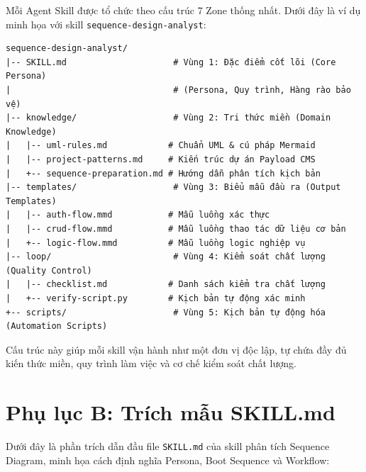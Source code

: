 \documentclass[13pt,a4paper,oneside]{extreport}
\numberwithin{equation}{chapter}
\numberwithin{figure}{chapter}
\numberwithin{table}{chapter}
\begin{document}
Mỗi Agent Skill được tổ chức theo cấu trúc 7 Zone thống nhất. Dưới đây là ví dụ minh họa với skill \texttt{sequence-design-analyst}:

\begin{verbatim}
sequence-design-analyst/
|-- SKILL.md                     # Vùng 1: Đặc điểm cốt lõi (Core Persona)
|                                # (Persona, Quy trình, Hàng rào bảo vệ)
|-- knowledge/                   # Vùng 2: Tri thức miền (Domain Knowledge)
|   |-- uml-rules.md            # Chuẩn UML & cú pháp Mermaid
|   |-- project-patterns.md     # Kiến trúc dự án Payload CMS
|   +-- sequence-preparation.md # Hướng dẫn phân tích kịch bản
|-- templates/                   # Vùng 3: Biểu mẫu đầu ra (Output Templates)
|   |-- auth-flow.mmd           # Mẫu luồng xác thực
|   |-- crud-flow.mmd           # Mẫu luồng thao tác dữ liệu cơ bản
|   +-- logic-flow.mmd          # Mẫu luồng logic nghiệp vụ
|-- loop/                        # Vùng 4: Kiểm soát chất lượng (Quality Control)
|   |-- checklist.md            # Danh sách kiểm tra chất lượng
|   +-- verify-script.py        # Kịch bản tự động xác minh
+-- scripts/                     # Vùng 5: Kịch bản tự động hóa (Automation Scripts)
\end{verbatim}

Cấu trúc này giúp mỗi skill vận hành như một đơn vị độc lập, tự chứa đầy đủ kiến thức miền, quy trình làm việc và cơ chế kiểm soát chất lượng.

\section*{Phụ lục B: Trích mẫu SKILL.md}

Dưới đây là phần trích dẫn đầu file \texttt{SKILL.md} của skill phân tích Sequence Diagram, minh họa cách định nghĩa Persona, Boot Sequence và Workflow:
\end{document}
